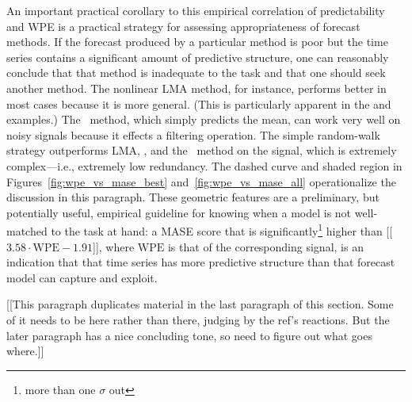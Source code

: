 
An important practical corollary to this empirical correlation of
predictability and WPE is a practical strategy for assessing
appropriateness of forecast methods.  If the forecast produced by a
particular method is poor but the time series contains a significant
amount of predictive structure, one can reasonably conclude that that
method is inadequate to the task and that one should seek another
method.  The nonlinear LMA method, for instance, performs better in
most cases because it is more general.  (This is particularly apparent
in the \col and \svdfive examples.)
The \naive ~method, which simply predicts the mean, can work very well
on noisy signals because it effects a filtering operation.  The simple
random-walk strategy outperforms LMA, \arima, and the \naive
~method on the \gcc signal, which is extremely complex---i.e.,
extremely low redundancy.
The dashed curve and shaded region in
Figures~\ref{fig:wpe_vs_mase_best} and~\ref{fig:wpe_vs_mase_all}
operationalize the discussion in this paragraph.  These geometric
features are a preliminary, but potentially useful, empirical
guideline for knowing when a model is not well-matched to the task at
hand: a MASE score that is significantly\footnote{more than one
  $\sigma$ out} higher than [[$3.58 \cdot \mathrm{WPE} - 1.91$]],
where $\mathrm{WPE}$ is that of the corresponding signal, is an
indication that that time series has more predictive structure than
that forecast model can capture and exploit.

[[This paragraph duplicates material in the last paragraph of this
    section.  Some of it needs to be here rather than there, judging
    by the ref's reactions.  But the later paragraph has a nice
    concluding tone, so need to figure out what goes where.]]

